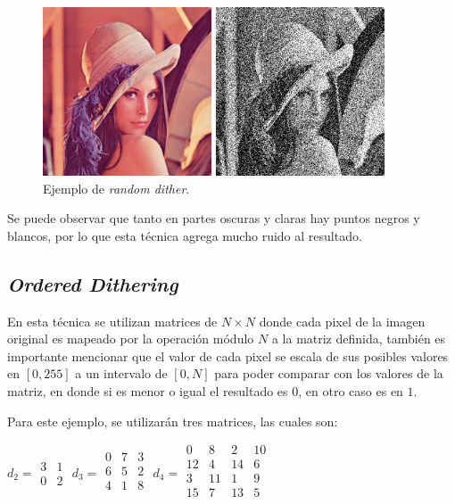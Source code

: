 \documentclass[conference]{IEEEtran}
\begin{document}
\begin{figure}[htbp]
\centerline{\includegraphics[height=50mm]{code/lena}}
\centerline{\includegraphics[height=50mm]{code/random_dither_lena}}
\caption{Ejemplo de \textit{random dither}.}
\label{random}
\end{figure}

Se puede observar que tanto en partes oscuras y claras hay puntos negros y blancos, por lo que esta técnica agrega mucho ruido al resultado.


\subsection{\textit{Ordered Dithering}}

En esta técnica se utilizan matrices de $N\times N$ donde cada pixel de la imagen original es mapeado por la operación módulo $N$ a la matriz definida, también es importante mencionar que el valor de cada pixel se escala de sus posibles valores en $[0,255]$ a un intervalo de $[0,N]$ para poder comparar con los valores de la matriz, en donde si es menor o igual el resultado es $0$, en otro caso es en $1$.

Para este ejemplo, se utilizarán tres matrices, las cuales son\cite{b3}:

$d_2=\begin{matrix}
	3 & 1\\
	0 & 2
\end{matrix}$
$d_3=\begin{matrix}
	0 & 7 & 3\\
	6 & 5 & 2\\
	4 & 1 & 8\\
\end{matrix}$
$d_4=\begin{matrix}
	0 & 8 & 2 & 10\\
	12 & 4 & 14 & 6\\
	3 & 11 & 1 & 9\\
	15 & 7 & 13 & 5\\
\end{matrix}$
\end{document}
